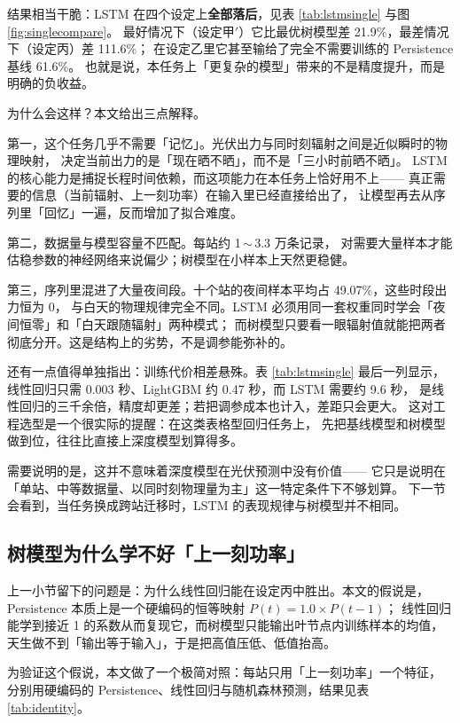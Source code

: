 \documentclass[11pt,a4paper]{ctexart}
\begin{document}
结果相当干脆：LSTM 在四个设定上\textbf{全部落后}，见表 \ref{tab:lstmsingle} 与图 \ref{fig:singlecompare}。
最好情况下（设定甲$'$）它比最优树模型差 21.9\%，最差情况下（设定丙）差 111.6\%；
在设定乙里它甚至输给了完全不需要训练的 Persistence 基线 61.6\%。
也就是说，本任务上「更复杂的模型」带来的不是精度提升，而是明确的负收益。

为什么会这样？本文给出三点解释。

第一，这个任务几乎不需要「记忆」。光伏出力与同时刻辐射之间是近似瞬时的物理映射，
决定当前出力的是「现在晒不晒」，而不是「三小时前晒不晒」。
LSTM 的核心能力是捕捉长程时间依赖，而这项能力在本任务上恰好用不上——
真正需要的信息（当前辐射、上一刻功率）在输入里已经直接给出了，
让模型再去从序列里「回忆」一遍，反而增加了拟合难度。

第二，数据量与模型容量不匹配。每站约 1\,$\sim$\,3.3 万条记录，
对需要大量样本才能估稳参数的神经网络来说偏少；树模型在小样本上天然更稳健。

第三，序列里混进了大量夜间段。十个站的夜间样本平均占 49.07\%，这些时段出力恒为 0，
与白天的物理规律完全不同。LSTM 必须用同一套权重同时学会「夜间恒零」和「白天跟随辐射」两种模式；
而树模型只要看一眼辐射值就能把两者彻底分开。这是结构上的劣势，不是调参能弥补的。

还有一点值得单独指出：训练代价相差悬殊。表 \ref{tab:lstmsingle} 最后一列显示，
线性回归只需 0.003 秒、LightGBM 约 0.47 秒，而 LSTM 需要约 9.6 秒，
是线性回归的三千余倍，精度却更差；若把调参成本也计入，差距只会更大。
这对工程选型是一个很实际的提醒：在这类表格型回归任务上，
先把基线模型和树模型做到位，往往比直接上深度模型划算得多。

需要说明的是，这并不意味着深度模型在光伏预测中没有价值——
它只是说明在「单站、中等数据量、以同时刻物理量为主」这一特定条件下不够划算。
下一节会看到，当任务换成跨站迁移时，LSTM 的表现规律与树模型并不相同。


\subsection{树模型为什么学不好「上一刻功率」}
\label{sec:identity}

上一小节留下的问题是：为什么线性回归能在设定丙中胜出。本文的假说是，
Persistence 本质上是一个硬编码的恒等映射 $P(t)=1.0\times P(t-1)$；
线性回归能学到接近 1 的系数从而复现它，而树模型只能输出叶节点内训练样本的均值，
天生做不到「输出等于输入」，于是把高值压低、低值抬高。

为验证这个假说，本文做了一个极简对照：每站只用「上一刻功率」一个特征，
分别用硬编码的 Persistence、线性回归与随机森林预测，结果见表 \ref{tab:identity}。
\end{document}
